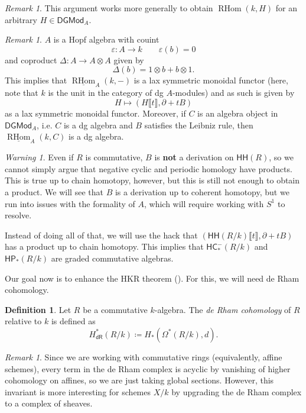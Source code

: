 \documentclass[10pt, oneside]{memoir}
\theoremstyle{definition}
\newtheorem{defn}[thm]{Definition}
\theoremstyle{remark}
\newtheorem{rmk}[thm]{Remark}
\newtheorem{warn}[thm]{Warning}
\theoremstyle{plain}
\theoremstyle{definition}
\theoremstyle{remark}
\newcommand{\ep}{\varepsilon}
\newcommand{\ms}[1]{\mathsf{#1}}
\newcommand{\ul}[1]{\underline{#1}}
\newcommand{\1}{\mathbf{1}}
\newcommand{\2}{\mathbf{2}}
\newcommand{\3}{\mathbf{3}}
\newcommand{\ps}[1]{\llbracket #1 \rrbracket}
\newcommand{\HC}{\ms{HC}}
\newcommand{\HH}{\ms{HH}}
\newcommand{\HP}{\ms{HP}}
\newcommand{\dR}{\ms{dR}}
\DeclareMathOperator{\RHom}{RHom}
\begin{document}
\begin{rmk}
    This argument works more generally to obtain \(\RHom(k, H) \) for an arbitrary \(H \in \ms{DGMod}_A \).
\end{rmk}

\begin{rmk}
    \(A \) is a Hopf algebra with couint
    \[ \ep \colon A \to k \qquad \ep(b) = 0 \]
    and coproduct \(\Delta \colon A \to A \otimes A \) given by
    \[ \Delta(b) = 1 \otimes b + b \otimes 1. \]
    This implies that \(\ul{\RHom}_A(k, -) \) is a lax symmetric monoidal functor (here, note that \(k \) is the unit in the category of dg \(A \)-modules) and as such is given by
    \[ H \mapsto (H \ps{t}, \partial + tB) \]
    as a lax symmetric monoidal functor. Moreover, if \(C \) is an algebra object in \(\ms{DGMod}_A \), i.e. \(C \) is a dg algebra and \(B \) satisfies the Leibniz rule, then \(\ul{\RHom}_A(k, C) \) is a dg algebra.
\end{rmk}

\begin{warn}
    Even if \(R \) is commutative, \(B \) is \textbf{not} a derivation on \(\HH(R) \), so we cannot simply argue that negative cyclic and periodic homology have products. This is true up to chain homotopy, however, but this is still not enough to obtain a product. We will see that \(B \) is a derivation up to coherent homotopy, but we run into issues with the formality of \(A \), which will require working with \(S^1 \) to resolve.

    Instead of doing all of that, we will use the hack that \((\HH(R/k)\ps{t}, \partial + tB) \) has a product up to chain homotopy. This implies that \(\HC_*^-(R/k) \) and \(\HP_*(R/k) \) are graded commutative algebras.
\end{warn}

Our goal now is to enhance the HKR theorem (). For this, we will need de Rham cohomology.

\begin{defn}
    Let \(R \) be a commutative \(k \)-algebra. The \textit{de Rham cohomology} of \(R \) relative to \(k \) is defined as
    \[ H^*_{\dR}(R/k) \coloneqq H_*(\Omega^*(R/k), d). \]
\end{defn}

\begin{rmk}
    Since we are working with commutative rings (equivalently, affine schemes), every term in the de Rham complex is acyclic by vanishing of higher cohomology on affines, so we are just taking global sections. However, this invariant is more interesting for schemes \(X/k \) by upgrading the de Rham complex to a complex of sheaves.
\end{rmk}
\end{document}
